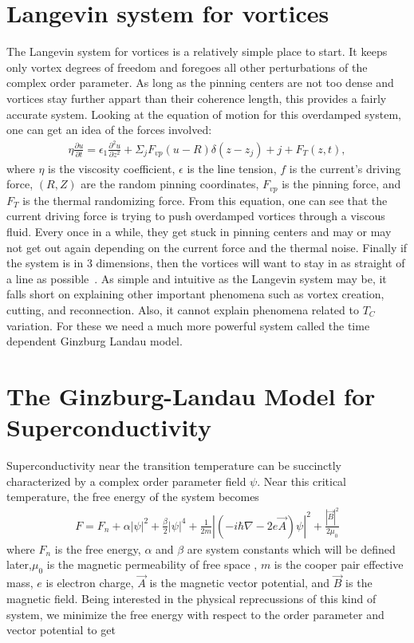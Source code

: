\section{Langevin system for vortices}
The Langevin system for vortices is a relatively simple place to start. It keeps only vortex degrees of freedom and foregoes all other perturbations of the complex order parameter. As long as the pinning centers are not too dense and vortices stay further appart than their coherence length, this provides a fairly accurate system. Looking at the equation of motion for this overdamped system, one can get an idea of the forces involved:
\begin{eqnarray}
\eta \frac {\partial u}{\partial t} = \epsilon_1 \frac {\partial^2 u} {\partial z^2 } + \Sigma_j F_{vp} (u - R) \delta(z - z_j) + j + F_T(z,t), 
\label{Langevin}
\end{eqnarray}
where $\eta$ is the viscosity coefficient, $\epsilon$ is the line tension, $f$ is the current's driving force, $(R,Z)$ are the random pinning coordinates, $F_{vp}$ is the pinning force, and $F_T$ is the thermal randomizing force. From this equation, one can see that the current driving force is trying to push overdamped vortices through a viscous fluid. Every once in a while, they get stuck in pinning centers and may or may not get out again depending on the current force and the thermal noise. Finally if the system is in 3 dimensions, then the vortices will want to stay in as straight of a line as possible~\cite{Kwok16}. As simple and intuitive as the Langevin system may be, it falls short on explaining other important phenomena such as vortex creation, cutting, and reconnection. Also, it cannot explain phenomena related to $T_C$ variation. For these we need a much more powerful system called the time dependent Ginzburg Landau model. 

\section{The Ginzburg-Landau Model for Superconductivity}
Superconductivity near the transition temperature can be succinctly characterized by a complex order parameter field $\psi$. Near this critical temperature, the free energy of the system becomes
\begin{eqnarray}
F = F_n + \alpha |\psi|^2 + \frac {\beta} {2} |\psi|^4 + \frac {1} {2m} |(-i \hbar \nabla - 2 e \overrightarrow A) \psi|^2 + \frac {|\overrightarrow B |^2} {2 \mu_0}
\label{freeE}
\end{eqnarray}
where $F_n$ is the free energy, $\alpha$ and $\beta$ are system constants which will be defined later,$\mu_0$ is the magnetic permeability of free space , $m$ is the cooper pair effective mass, $e$ is electron charge, $\overrightarrow A$ is the magnetic vector potential, and $\overrightarrow B$ is the magnetic field. Being interested in the physical reprecussions of this kind of system, we minimize the free energy with respect to the order parameter and vector potential to get

